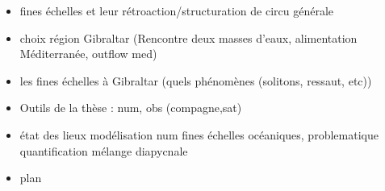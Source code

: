 \hypersetup{pdfborder=0 0 0}


\begin{itemize}
\item fines échelles et leur rétroaction/structuration de circu générale
\item choix région Gibraltar (Rencontre deux masses d'eaux, alimentation Méditerranée, outflow med)
\item les fines échelles à Gibraltar (quels phénomènes (solitons, ressaut, etc))
\item Outils de la thèse : num, obs (compagne,sat)
\item état des lieux modélisation num fines échelles océaniques, problematique quantification mélange diapycnale
\item plan
\end{itemize}
